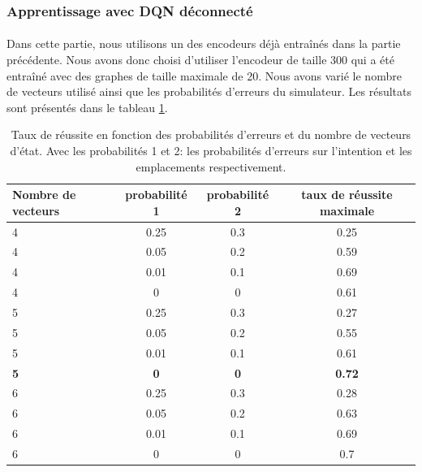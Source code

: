 \subsubsection{Apprentissage avec DQN déconnecté}
\paragraph{}Dans cette partie, nous utilisons un des encodeurs déjà entraînés dans la partie précédente. Nous avons donc choisi d'utiliser l'encodeur de taille 300 qui a été entraîné avec des graphes de taille maximale de 20. Nous avons varié le nombre de vecteurs utilisé ainsi que les probabilités d'erreurs du simulateur. Les résultats sont présentés dans le tableau \ref{table_results_dis}.
\begin{table}[H]
	\begin{center}
		
		\begin{tabular}{|l|c|c|c|}
			\hline
			\textbf{Nombre de vecteurs} & \textbf{probabilité 1} & \textbf{probabilité 2} & \textbf{taux de réussite maximale}\\
			\hline
			4 & 0.25 & 0.3 & 0.25\\
			\hline
			4 & 0.05 & 0.2 & 0.59\\
			\hline
			\rowcolor{LightCyan}
			4 & 0.01 & 0.1 & 0.69\\
			\hline
			4 & 0 & 0 & 0.61\\
			\hline
			5 & 0.25 & 0.3 & 0.27\\
			\hline
			5 & 0.05 & 0.2 & 0.55\\
			\hline
			5 & 0.01 & 0.1 & 0.61\\
			\hline
			\textbf{5} & \textbf{0} & \textbf{0} & \textbf{0.72}\\
			\hline
			6 & 0.25 & 0.3 & 0.28\\
			\hline
			6 & 0.05 & 0.2 & 0.63\\
			\hline
			\rowcolor{LightCyan}
			6 & 0.01 & 0.1 & 0.69\\
			\hline
			6 & 0 & 0 & 0.7\\
			\hline
		\end{tabular}
		\caption{Taux de réussite en fonction des probabilités d'erreurs et du nombre de vecteurs d'état. Avec les probabilités 1 et 2: les probabilités d'erreurs sur l'intention et les emplacements respectivement.}\label{table_results_dis}
	\end{center}
\end{table}
